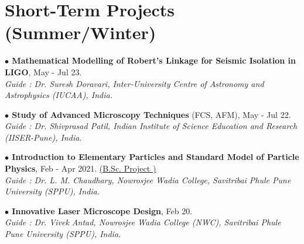 \section{Short-Term Projects (Summer/Winter)}

        \begin{onecolentry}
            \textbf{$\bullet$ Mathematical Modelling of Robert’s Linkage for Seismic Isolation in LIGO}, May - Jul 23.  \href{https://drive.google.com/file/d/1-pubIKgLbrkpFbzaoyhea7KZnE0AYM1R/view?usp=sharing}{\faExternalLink} \\
            \textit{Guide : Dr. Suresh Doravari, Inter-University Centre of Astronomy and Astrophysics (IUCAA), India.}
        \end{onecolentry}
        
        \vspace{0.1 cm}
        
        \begin{onecolentry}
            \textbf{$\bullet$ Study of Advanced Microscopy Techniques} (FCS, AFM), May - Jul 22.\\
            \textit{Guide : Dr. Shivprasad Patil, Indian Institute of Science Education and Research (IISER-Pune), India.}
        \end{onecolentry}    
        
        \vspace{0.1 cm}
        
        \begin{onecolentry}
            \textbf{$\bullet$ Introduction to Elementary Particles and Standard Model of Particle Physics}, Feb - Apr 2021.
            \href{https://drive.google.com/file/d/1G1gYijihDofVz5WPNy9w-gBTX9VIDLJ8/view?usp=sharing}{(B.Sc. Project )}\\
            \textit{Guide : Dr. L. M. Chaudhary, Nowrosjee Wadia College, Savitribai Phule Pune University (SPPU), India.}            
        \end{onecolentry}
        
        \vspace{0.1 cm}
        
        \begin{onecolentry}
           \textbf{$\bullet$ Innovative Laser Microscope Design}, Feb 20.\\
            \textit{Guide : Dr. Vivek Antad, Nowrosjee Wadia College (NWC), Savitribai Phule Pune University (SPPU), India.}
        \end{onecolentry}
        
